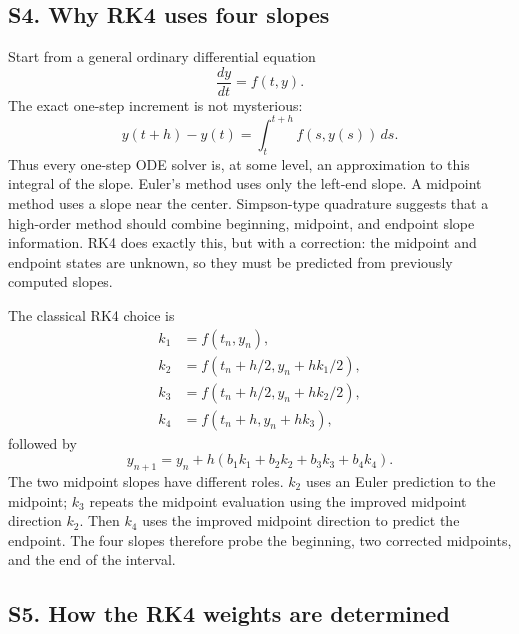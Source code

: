 \documentclass[aps,pra,preprint,superscriptaddress,nofootinbib]{revtex4-2}
\begin{document}
\subsection*{S4. Why RK4 uses four slopes}

Start from a general ordinary differential equation
\begin{equation}
\frac{dy}{dt}=f(t,y).
\label{eq:s4-ode}
\end{equation}
The exact one-step increment is not mysterious:
\begin{equation}
y(t+h)-y(t)=\int_t^{t+h} f(s,y(s))\,ds.
\label{eq:s4-integral}
\end{equation}
Thus every one-step ODE solver is, at some level, an approximation to this integral of the slope. Euler's method uses only the left-end slope. A midpoint method uses a slope near the center. Simpson-type quadrature suggests that a high-order method should combine beginning, midpoint, and endpoint slope information. RK4 does exactly this, but with a correction: the midpoint and endpoint states are unknown, so they must be predicted from previously computed slopes.

The classical RK4 choice is
\begin{align}
k_1&=f(t_n,y_n),\\
k_2&=f(t_n+h/2,y_n+hk_1/2),\\
k_3&=f(t_n+h/2,y_n+hk_2/2),\\
k_4&=f(t_n+h,y_n+hk_3),
\label{eq:s4-stages}
\end{align}
followed by
\begin{equation}
y_{n+1}=y_n+h(b_1k_1+b_2k_2+b_3k_3+b_4k_4).
\label{eq:s4-generic-rk}
\end{equation}
The two midpoint slopes have different roles. \(k_2\) uses an Euler prediction to the midpoint; \(k_3\) repeats the midpoint evaluation using the improved midpoint direction \(k_2\). Then \(k_4\) uses the improved midpoint direction to predict the endpoint. The four slopes therefore probe the beginning, two corrected midpoints, and the end of the interval.

\subsection*{S5. How the RK4 weights are determined}
\end{document}
